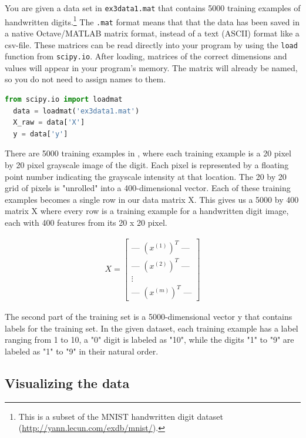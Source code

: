 \documentclass[12pt]{article}
\begin{document}
You are given a data set in \texttt{ex3data1.mat} that contains 5000 training examples of handwritten digits.\footnote{This is a subset of the MNIST handwritten digit dataset (\href{http://yann.lecun.com/exdb/mnist/}{http://yann.lecun.com/exdb/mnist/}).} The \texttt{.mat} format means that that the data has been saved in a native Octave/MATLAB matrix format, instead of a text (ASCII) format like a csv-file. These matrices can be read directly into your program by using the \texttt{load} function from \texttt{scipy.io}. After loading, matrices of the correct dimensions and values will appear in your program’s memory. The matrix will already be named, so you do not need to assign names to them.

\begin{lstlisting}[language=Python]
  from scipy.io import loadmat
  data = loadmat('ex3data1.mat')
  X_raw = data['X']
  y = data['y']
\end{lstlisting}

There are 5000 training examples in , where each training example is a 20 pixel by 20 pixel grayscale image of the digit. Each pixel is represented by a floating point number indicating the grayscale intensity at that location. The 20 by 20 grid of pixels is "unrolled" into a 400-dimensional vector. Each of these training examples becomes a single row in our data matrix X. This gives us a 5000 by 400 matrix X where every row is a training example for a handwritten digit image, each with 400 features from its 20 x 20 pixel.

\begin{align}
  \mathbf {}X = \begin{bmatrix} \text{--- }(x^{(1)})^T \text{ ---} \\ \text{--- }(x^{(2)})^T \text{ ---} \\ \vdots \\ \text{--- }(x^{(m)})^T \text{ ---} \end{bmatrix}
\end{align}

The second part of the training set is a 5000-dimensional vector y that contains labels for the training set. In the given dataset, each training example has a label ranging from 1 to 10, a "0" digit is labeled as "10", while the digits "1" to "9" are labeled as "1" to "9" in their natural order.

\subsection{Visualizing the data}
\end{document}
